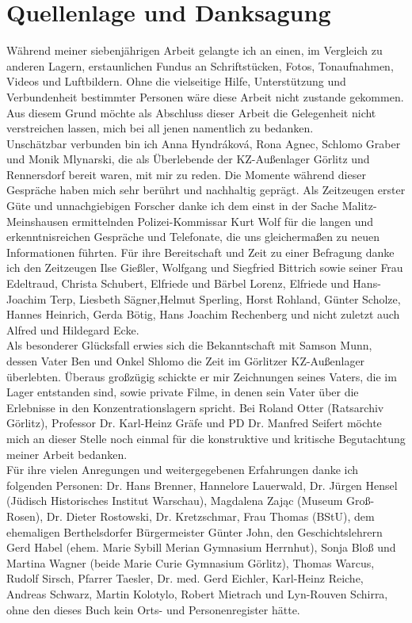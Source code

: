 \documentclass[a4paper,12pt,ngerman,
]{nisebook}
\begin{document}
{}

{}



 
\section*{Quellenlage und Danksagung}
Während meiner siebenjährigen Arbeit gelangte ich an einen, im Vergleich zu anderen Lagern, erstaunlichen Fundus an Schriftstücken, Fotos, Tonaufnahmen, Videos und Luftbildern. Ohne die vielseitige Hilfe, Unterstützung und Verbundenheit bestimmter Personen wäre diese Arbeit nicht zustande gekommen. Aus diesem Grund möchte als Abschluss dieser Arbeit die Gelegenheit nicht verstreichen lassen, mich bei all jenen namentlich zu bedanken.
\\
Unschätzbar verbunden bin ich Anna Hyndr\'akov\'a, Rona Agnec, Schlomo Graber und Monik Mlynarski, die als Überlebende der KZ-Außenlager Görlitz und Rennersdorf bereit waren, mit mir zu reden. Die Momente während dieser Gespräche haben mich sehr berührt und nachhaltig geprägt. Als Zeitzeugen erster Güte und unnachgiebigen Forscher danke ich dem einst in der Sache Malitz-Meinshausen ermittelnden Polizei-Kommissar Kurt Wolf für die langen und erkenntnisreichen Gespräche und Telefonate, die uns gleichermaßen zu neuen Informationen führten.
Für ihre Bereitschaft und Zeit zu einer Befragung danke ich den Zeitzeugen Ilse Gießler, Wolfgang und Siegfried Bittrich sowie seiner Frau Edeltraud, Christa Schubert, Elfriede und Bärbel Lorenz, Elfriede und Hans-Joachim Terp, Liesbeth Sägner,Helmut Sperling, Horst Rohland, Günter Scholze, Hannes Heinrich, Gerda Bötig, Hans Joachim Rechenberg und nicht zuletzt auch Alfred und Hildegard Ecke.
\\
Als besonderer Glücksfall erwies sich die Bekanntschaft mit Samson Munn, dessen Vater Ben und Onkel Shlomo die Zeit im Görlitzer KZ-Außenlager überlebten. Überaus großzügig schickte er mir Zeichnungen seines Vaters, die im Lager entstanden sind, sowie private Filme, in denen sein Vater über die Erlebnisse in den Konzentrationslagern spricht.
Bei Roland Otter (Ratsarchiv Görlitz), Professor Dr. Karl-Heinz Gräfe und PD Dr. Manfred Seifert möchte mich an dieser Stelle noch einmal für die konstruktive und kritische Begutachtung meiner Arbeit bedanken.
\\
Für ihre vielen Anregungen und weitergegebenen Erfahrungen danke ich folgenden Personen: Dr. Hans Brenner, Hannelore Lauerwald, Dr. Jürgen Hensel (Jüdisch Historisches Institut Warschau), Magdalena Zając (Museum Groß-Rosen), Dr. Dieter Rostowski, Dr. Kretzschmar, Frau Thomas (BStU), dem ehemaligen Berthelsdorfer Bürgermeister Günter John, den Geschichtslehrern Gerd Habel (ehem. Marie Sybill Merian Gymnasium Herrnhut), Sonja Bloß und Martina Wagner (beide Marie Curie Gymnasium Görlitz), Thomas Warcus, Rudolf Sirsch, Pfarrer Taesler, Dr. med. Gerd Eichler, Karl-Heinz Reiche, Andreas Schwarz, Martin Kolotylo, Robert Mietrach und Lyn-Rouven Schirra, ohne den dieses Buch kein Orts- und Personenregister hätte.
\end{document}
